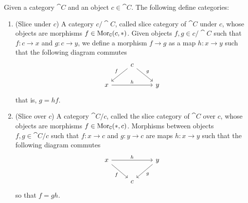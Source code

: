\begin{proposition}\label{prop: slice cat}
    Given a category \(\cat C\) and an object \(c \in \cat C\). The following
    define categories:
    \begin{enumerate}[(SC1)]
        \item\label{prop: slice under}
        (Slice under \(c\)) A category \(c/\cat C\), called slice category of
        \(\cat C\) under \(c\), whose objects are morphisms \(f \in \operatorname{Mor}_{\texttt
            C}(c, *)\). Given objects \(f, g \in c/\cat C\) such that \(f: c \to x\)
        and \(g: c \to y\), we define a morphism \(f \to g\) as a map \(h: x \to
        y\) such that the following diagram commutes
        \[
            \begin{tikzcd}
                &c \ar[dl, swap,"f"] \ar[dr, "g"]\\
                x \ar[rr, "h"] & &y
            \end{tikzcd}
        \]
        that is, \(g = h  f\).
        \item\label{prop: slice over}
        (Slice over \(c\)) A category \(\cat C/c\), called the slice category of
        \(\cat C\) over \(c\), whose objects are morphisms \(f \in \operatorname{Mor}_{\texttt
            C}(*, c)\). Morphisms between objects \(f, g \in \cat C/c\) such that \(f:
        x \to c\) and \(g: y \to c\) are maps \(h: x \to y\) such that the
        following diagram commutes
        \[
            \begin{tikzcd}
                x \ar[rr, "h"] \ar[dr, swap, "f"]
                & &y \ar[dl, "g"] \\
                &c
            \end{tikzcd}
        \]
        so that \(f = g  h\).
    \end{enumerate}
\end{proposition}

